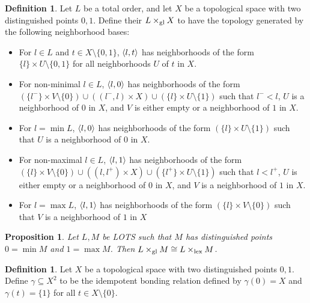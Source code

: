 \documentclass{amsart}
\theoremstyle{plain}
\newtheorem{proposition}[theorem]{Proposition}
\theoremstyle{definition}
\newtheorem{definition}[theorem]{Definition}
\theoremstyle{remark}
\theoremstyle{plain}
\theoremstyle{definition}
\theoremstyle{remark}
\begin{document}
\begin{definition}
  Let \(L\) be a total order, and let \(X\) be a topological space with
  two distinguished points \(0,1\). Define their  \(L\times_{\operatorname{gl}} X\) to have the topology generated by the following
  neighborhood bases:
  \begin{itemize}
    \item For \(l\in L\) and \(t\in X\setminus\{0,1\}\), \(\langle l,t\rangle\) has
      neighborhoods of the form \(\{l\}\times U\setminus\{0,1\}\) for all
      neighborhoods \(U\) of \(t\) in \(X\).
    \item For non-minimal \(l\in L\), \(\langle l,0\rangle\) has neighborhoods of the form
    \(
      (\{l^-\}\times V\setminus\{0\})
        \cup
      ((l^-,l)\times X)
        \cup
      (\{l\}\times U\setminus \{1\})
    \)
      such that \(l^-<l\), \(U\) is a neighborhood of \(0\) in \(X\), and \(V\)
      is either empty or a neighborhood of \(1\) in \(X\).
    \item For \(l=\min L\), \(\langle l,0\rangle\) has neighborhoods of the form
    \(
      (\{l\}\times U\setminus \{1\})
    \)
      such that \(U\) is a neighborhood of \(0\) in \(X\).
    \item For non-maximal \(l\in L\), \(\langle l,1\rangle\) has neighborhoods of the form
    \(
      (\{l\}\times V\setminus\{0\})
        \cup
      ((l,l^+)\times X)
        \cup
      (\{l^+\}\times U\setminus \{1\})
    \)
      such that \(l<l^+\), \(U\) is either empty or a neighborhood of \(0\) in
      \(X\), and \(V\) is a neighborhood of \(1\) in \(X\).
    \item For \(l=\max L\), \(\langle l,1\rangle\) has neighborhoods of the form
    \(
      (\{l\}\times V\setminus \{0\})
    \)
      such that \(V\) is a neighborhood of \(1\) in \(X\)
  \end{itemize}
\end{definition}

\begin{proposition}
  Let \(L,M\) be LOTS such that \(M\) has distinguished points \(0=\min M\)
  and \(1=\max M\). Then \(L\times_{\operatorname{gl}} M \cong L\times_{\operatorname{lex}} M\).
\end{proposition}

\begin{definition}
  Let \(X\) be a topological space with
  two distinguished points \(0,1\). Define \(\gamma\subseteq X^2\) to be the
  idempotent bonding relation defined by \(\gamma(0)=X\) and
  \(\gamma(t)=\{1\}\) for all \(t\in X\setminus\{0\}\).
\end{definition}
\end{document}
